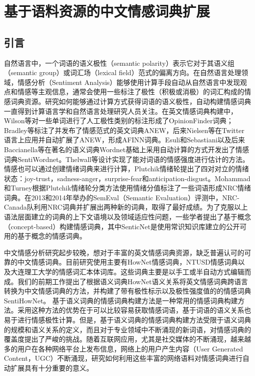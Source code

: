 \chapter{基于语料资源的中文情感词典扩展}
\label{ch3}

\section{引言}

自然语言中，一个词语的语义极性（semantic polarity）表示它对于其语义组（semantic group）或词汇场（lexical field）范式的偏离方向。在自然语言处理领域，情感分析（Sentiment Analysis）能够使用计算手段自动从自然语言中发现观点和情感等主观信息，通常会使用一些标注了极性（积极或消极）的词汇构成的情感词典资源。研究如何能够通过计算方式获得词语的语义极性，自动构建情感词典一直得到计算语言学和自然语言处理研究人员关注。在英文情感词典构建中，Wilson等对一些单词进行了人工极性类别的标注形成了OpinionFinder词典；Bradley等标注了并发布了情感范式的英文词典ANEW，后来Nielsen等在Twitter语言上应用并自动扩展了ANEW，形成AFINN词典。Esuli和Sebastiani以及后来Baccianella等在著名的语义词典Wordnet基础上采用自动计算的方式开发出了情感词典SentiWordnet。Thelwall等设计实现了能对词语的情感强度进行估计的方法。情感也可以通过创建情绪词典来进行计算，Plutchik情绪轮提出了四对对立的情绪状态：joy-trust，sadness-anger，surprise-fear和anticipation-disgust。Mohammad和Turney根据Plutchik情绪轮分类方法使用情绪分值标注了一些词语形成NRC情绪词典。在2013和2014年举办的SemEval（Semantic Evaluation）评测中，NRC-Canada队利用NRC词典并扩展出两种新的词典，取得了最好成绩。为了克服以上语法层面建立的词典的上下文语境以及领域适应性问题，一些学者提出了基于概念（concept-based）构建情感词典，其中SenticNet是使用常识知识库建立的公开可用的基于概念的情感词典。

中文情感分析研究起步较晚，想对于丰富的英文情感词典资源，缺乏普遍认可的可靠的中文情感词典。目前研究使用主要有HowNet情感词典，NTUSD情感词典以及大连理工大学的情感词汇本体词库。这些词典主要是以手工或半自动方式编辑而成。我们的前期工作提出了根据语义词典HowNet语义关系将英文情感词典跨语言转换为中文情感词典的方法，并构建了带有极性标示以及极性强度值的的情感词典SentiHowNet。
基于语义词典的情感词典构建方法是一种常用的情感词典构建方法。采用这种方法的优势在于可以比较容易获取情感词语，基于词语的语义关系也易于进行情感极性计算。但是，基于语义词典的情感词典构建方法受限于语义词典的规模和语义关系的定义，而且对于专业领域中不断涌现的新词语，对情感词典的覆盖度提出了严峻的挑战。随着互联网应用，尤其是社交媒体的不断涌现，越来越多的用户在各种网络平台上发布信息，网络上的用户产生内容（User Generated Content，UGC）不断涌现，研究如何利用这些丰富的网络语料对情感词典进行自动扩展具有十分重要的意义。

